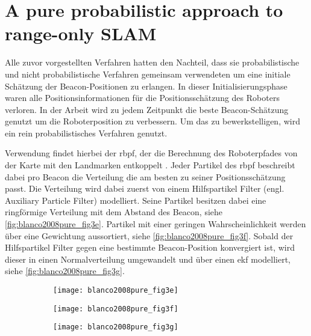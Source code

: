 %
%


%
%
%
\section{A pure probabilistic approach to range-only SLAM}\label{sec:blanco2008pure}

Alle zuvor vorgestellten Verfahren hatten den Nachteil, dass sie probabilistische und nicht probabilistische Verfahren gemeinsam verwendeten um eine initiale Schätzung der Beacon-Positionen zu erlangen. In dieser Initialisierungsphase waren alle Positionsinformationen für die Positionsschätzung des Roboters verloren. In der Arbeit  \cite{blanco2008pure} wird zu jedem Zeitpunkt die beste Beacon-Schätzung genutzt um die Roboterposition zu verbessern. Um das zu bewerkstelligen, wird ein rein probabilistisches Verfahren genutzt.

Verwendung findet hierbei der \Gls{rbpf}, der die Berechnung des Roboterpfades von der Karte mit den Landmarken entkoppelt \cite{murphy2001rao, montemerlo2002fastslam}. Jeder Partikel des \Gls{rbpf} beschreibt dabei pro Beacon die Verteilung die am besten zu seiner Positionsschätzung passt. Die Verteilung wird dabei zuerst von einem Hilfspartikel Filter (engl. Auxiliary Particle Filter) modelliert. Seine Partikel besitzen dabei eine ringförmige Verteilung mit dem Abstand des Beacon, siehe \autoref{fig:blanco2008pure_fig3e}. Partikel mit einer geringen Wahrscheinlichkeit werden über eine Gewichtung aussortiert, siehe \autoref{fig:blanco2008pure_fig3f}. Sobald der Hilfspartikel Filter gegen eine bestimmte Beacon-Position konvergiert ist, wird dieser in einen Normalverteilung umgewandelt und über einen \Gls{ekf} modelliert, siehe \autoref{fig:blanco2008pure_fig3g}.

\begin{figure}
	\begin{subfigure}[t]{0.3\linewidth}
		\texttt{[image: blanco2008pure\_fig3e]}
		\caption{}
		\label{fig:blanco2008pure_fig3e}
	\end{subfigure}
	\hfill
	\begin{subfigure}[t]{0.3\linewidth}
		\texttt{[image: blanco2008pure\_fig3f]}
		\caption{}
		\label{fig:blanco2008pure_fig3f}
	\end{subfigure}
	\hfill
	\begin{subfigure}[t]{0.3\linewidth}
		\texttt{[image: blanco2008pure\_fig3g]}
		\caption{}
		\label{fig:blanco2008pure_fig3g}
	\end{subfigure}
	\label{fig:blanco2008pure_fig3}
\end{figure}


